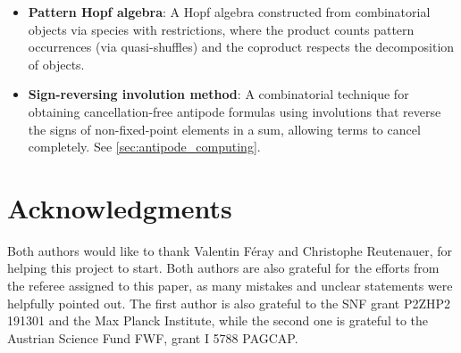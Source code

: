 \documentclass[12pt, reqno]{amsart}
\theoremstyle{definition}
\begin{document}
\begin{itemize}
\item \textbf{Pattern Hopf algebra}: A Hopf algebra constructed from combinatorial objects via species with restrictions, where the product counts pattern occurrences (via quasi-shuffles) and the coproduct respects the decomposition of objects.

\item \textbf{Sign-reversing involution method}: A combinatorial technique for obtaining cancellation-free antipode formulas using involutions that reverse the signs of non-fixed-point elements in a sum, allowing terms to cancel completely. See \cref{sec:antipode_computing}.

\end{itemize}

\section*{Acknowledgments}

Both authors would like to thank Valentin F\'eray and Christophe Reutenauer, for helping this project to start.
Both authors are also grateful for the efforts from the referee assigned to this paper, as many mistakes and unclear statements were helpfully pointed out.
The first author is also grateful to the SNF grant P2ZHP2 191301 and the Max Planck Institute, while the second one is grateful to the Austrian Science Fund FWF, grant I 5788 PAGCAP.


%
%




\end{document}
